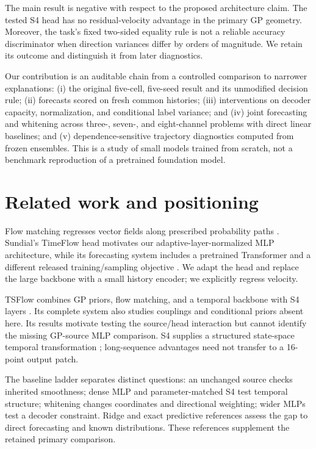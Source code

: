 \documentclass[10pt,twocolumn]{article}
\begin{document}
The main result is negative with respect to the proposed architecture claim. The tested S4 head has no residual-velocity advantage in the primary GP geometry. Moreover, the task's fixed two-sided equality rule is not a reliable accuracy discriminator when direction variances differ by orders of magnitude. We retain its outcome and distinguish it from later diagnostics.

Our contribution is an auditable chain from a controlled comparison to narrower explanations: (i) the original five-cell, five-seed result and its unmodified decision rule; (ii) forecasts scored on fresh common histories; (iii) interventions on decoder capacity, normalization, and conditional label variance; and (iv) joint forecasting and whitening across three-, seven-, and eight-channel problems with direct linear baselines; and (v) dependence-sensitive trajectory diagnostics computed from frozen ensembles. This is a study of small models trained from scratch, not a benchmark reproduction of a pretrained foundation model.

\section{Related work and positioning}
Flow matching regresses vector fields along prescribed probability paths \cite{lipman}. Sundial's TimeFlow head motivates our adaptive-layer-normalized MLP architecture, while its forecasting system includes a pretrained Transformer and a different released training/sampling objective \cite{sundial}. We adapt the head and replace the large backbone with a small history encoder; we explicitly regress velocity.

TSFlow combines GP priors, flow matching, and a temporal backbone with S4 layers \cite{tsflow}. Its complete system also studies couplings and conditional priors absent here. Its results motivate testing the source/head interaction but cannot identify the missing GP-source MLP comparison. S4 supplies a structured state-space temporal transformation \cite{s4}; long-sequence advantages need not transfer to a 16-point output patch.

The baseline ladder separates distinct questions: an unchanged source checks inherited smoothness; dense MLP and parameter-matched S4 test temporal structure; whitening changes coordinates and directional weighting; wider MLPs test a decoder constraint. Ridge and exact predictive references assess the gap to direct forecasting and known distributions. These references supplement the retained primary comparison.
\end{document}
